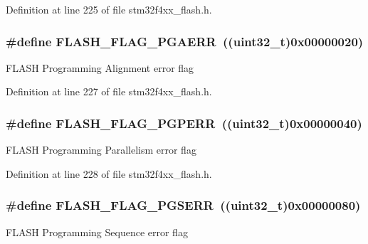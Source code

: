 Definition at line 225 of file stm32f4xx\-\_\-flash.\-h.

\hypertarget{group___f_l_a_s_h___flags_ga2c3f4dbea065f8ea2987eada4dab30bd}{
\subsubsection[{F\-L\-A\-S\-H\-\_\-\-F\-L\-A\-G\-\_\-\-P\-G\-A\-E\-R\-R}]{\setlength{\rightskip}{0pt plus 5cm}\#define F\-L\-A\-S\-H\-\_\-\-F\-L\-A\-G\-\_\-\-P\-G\-A\-E\-R\-R~((uint32\-\_\-t)0x00000020)}}\label{group___f_l_a_s_h___flags_ga2c3f4dbea065f8ea2987eada4dab30bd}
F\-L\-A\-S\-H Programming Alignment error flag 

Definition at line 227 of file stm32f4xx\-\_\-flash.\-h.

\hypertarget{group___f_l_a_s_h___flags_ga88a93907641f5eeb4091a26b84c94897}{
\subsubsection[{F\-L\-A\-S\-H\-\_\-\-F\-L\-A\-G\-\_\-\-P\-G\-P\-E\-R\-R}]{\setlength{\rightskip}{0pt plus 5cm}\#define F\-L\-A\-S\-H\-\_\-\-F\-L\-A\-G\-\_\-\-P\-G\-P\-E\-R\-R~((uint32\-\_\-t)0x00000040)}}\label{group___f_l_a_s_h___flags_ga88a93907641f5eeb4091a26b84c94897}
F\-L\-A\-S\-H Programming Parallelism error flag 

Definition at line 228 of file stm32f4xx\-\_\-flash.\-h.

\hypertarget{group___f_l_a_s_h___flags_ga25b80c716320e667162846da8be09b68}{
\subsubsection[{F\-L\-A\-S\-H\-\_\-\-F\-L\-A\-G\-\_\-\-P\-G\-S\-E\-R\-R}]{\setlength{\rightskip}{0pt plus 5cm}\#define F\-L\-A\-S\-H\-\_\-\-F\-L\-A\-G\-\_\-\-P\-G\-S\-E\-R\-R~((uint32\-\_\-t)0x00000080)}}\label{group___f_l_a_s_h___flags_ga25b80c716320e667162846da8be09b68}
F\-L\-A\-S\-H Programming Sequence error flag 

